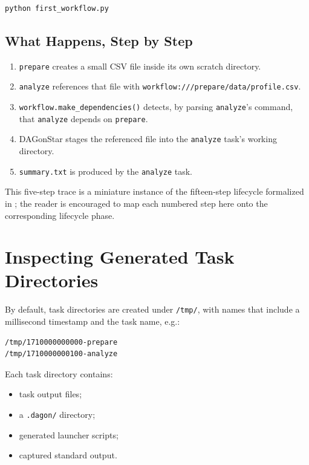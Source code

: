 \begin{lstlisting}[style=bash]
python first_workflow.py
\end{lstlisting}

\subsection{What Happens, Step by Step}

\begin{enumerate}[leftmargin=1.6em]
  \item \texttt{prepare} creates a small CSV file inside its own scratch
    directory.
  \item \texttt{analyze} references that file with
    \texttt{workflow:///prepare/data/profile.csv}.
  \item \texttt{workflow.make\_dependencies()} detects, by parsing
    \texttt{analyze}'s command, that \texttt{analyze} depends on
    \texttt{prepare}.
  \item DAGonStar stages the referenced file into the \texttt{analyze}
    task's working directory.
  \item \texttt{summary.txt} is produced by the \texttt{analyze} task.
\end{enumerate}

This five-step trace is a miniature instance of the fifteen-step lifecycle
formalized in ; the reader is encouraged to map
each numbered step here onto the corresponding lifecycle phase.

\section{Inspecting Generated Task Directories}

By default, task directories are created under \texttt{/tmp/}, with names
that include a millisecond timestamp and the task name, e.g.:

\begin{lstlisting}[style=bash]
/tmp/1710000000000-prepare
/tmp/1710000000100-analyze
\end{lstlisting}

Each task directory contains:

\begin{itemize}[leftmargin=1.4em]
  \item task output files;
  \item a \texttt{.dagon/} directory;
  \item generated launcher scripts;
  \item captured standard output.
\end{itemize}

